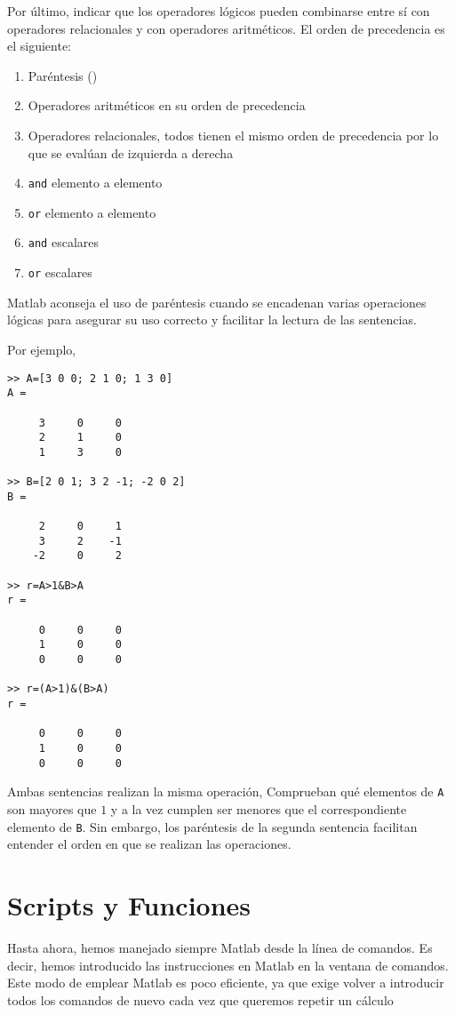 Por último, indicar que los operadores lógicos pueden combinarse entre sí con operadores relacionales y con operadores aritméticos. El orden de precedencia es el siguiente:
\begin{enumerate}
\item  Paréntesis ()
\item  Operadores aritméticos en su orden de precedencia
\item  Operadores relacionales, todos tienen el mismo orden de precedencia por lo que se evalúan de izquierda a derecha
\item \texttt{and} elemento a elemento
\item \texttt{or} elemento a elemento
\item \texttt{and} escalares
\item \texttt{or} escalares
\end{enumerate}

Matlab aconseja el uso de paréntesis cuando se encadenan varias operaciones lógicas para asegurar su uso correcto y facilitar la lectura de las sentencias.

Por ejemplo,
\begin{verbatim}
>> A=[3 0 0; 2 1 0; 1 3 0]
A =

     3     0     0
     2     1     0
     1     3     0

>> B=[2 0 1; 3 2 -1; -2 0 2]
B =

     2     0     1
     3     2    -1
    -2     0     2

>> r=A>1&B>A
r =

     0     0     0
     1     0     0
     0     0     0

>> r=(A>1)&(B>A)
r =

     0     0     0
     1     0     0
     0     0     0
\end{verbatim}

Ambas sentencias realizan la misma operación, Comprueban qué elementos de \texttt{A} son mayores que $1$ y a la vez cumplen ser menores que el correspondiente elemento de \texttt{B}. Sin embargo, los paréntesis de la segunda sentencia facilitan entender el orden en que se realizan las operaciones. 



\section{Scripts y Funciones} \label{funciones}
Hasta ahora, hemos manejado siempre Matlab desde la línea de comandos. Es decir, hemos introducido las instrucciones en Matlab en la ventana de comandos. Este modo de emplear Matlab es poco eficiente, ya que exige volver a introducir todos los comandos de nuevo cada vez que queremos repetir un cálculo

